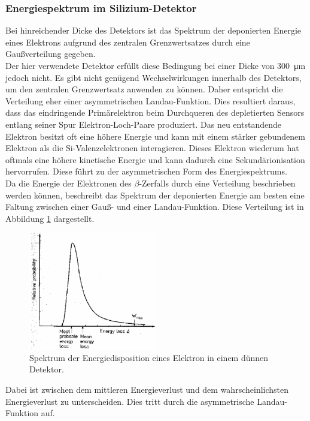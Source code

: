 \subsubsection{Energiespektrum im Silizium-Detektor}
Bei hinreichender Dicke des Detektors ist das Spektrum der deponierten Energie eines Elektrons aufgrund des zentralen Grenzwertsatzes durch eine Gaußverteilung gegeben.\\
Der hier verwendete Detektor erfüllt diese Bedingung bei einer Dicke von
\SI{300}{\micro\meter} jedoch nicht. Es gibt nicht genügend Wechselwirkungen
innerhalb des Detektors, um den zentralen Grenzwertsatz anwenden zu können.
Daher entspricht die Verteilung eher einer asymmetrischen Landau-Funktion.
Dies resultiert daraus, dass das eindringende Primärelektron beim Durchqueren des depletierten Sensors entlang seiner Spur Elektron-Loch-Paare produziert. Das neu entstandende Elektron besitzt oft eine höhere Energie und kann mit einem stärker gebundenem Elektron als die Si-Valenzelektronen interagieren. Dieses Elektron wiederum hat oftmals eine höhere kinetische Energie und kann dadurch eine Sekundärionisation hervorrufen. Diese führt zu der asymmetrischen Form des Energiespektrums.\\
Da die Energie der Elektronen des $\beta$-Zerfalls durch eine Verteilung beschrieben werden können, beschreibt das Spektrum der deponierten Energie am besten eine Faltung zwischen einer Gauß- und einer Landau-Funktion. Diese Verteilung ist in Abbildung \ref{fig:faltung} dargestellt.
\begin{figure}[htb]
  \centering
  \includegraphics[width=0.5\textwidth]{graphics/Landau.pdf}
  \caption{Spektrum der Energiedisposition eines Elektron in einem dünnen Detektor. \cite{anleitung}}
  \label{fig:faltung}
\end{figure}
Dabei ist zwischen dem mittleren Energieverlust und dem wahrscheinlichsten Energieverlust zu unterscheiden. Dies tritt durch die asymmetrische Landau-Funktion auf.

